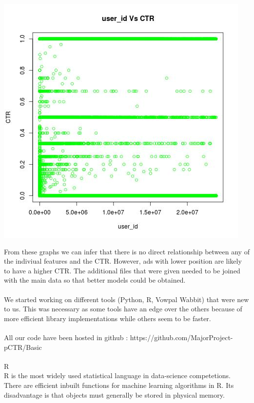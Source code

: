 \documentclass[10pt]{article}
\begin{document}
\includegraphics[scale=0.5]{user_id_Vs_CTR}

From these graphs we can infer that there is no direct relationship between any of the indiviual features and the CTR. However, ads with lower position are likely to have a higher CTR.
The additional files that were given needed to be joined with the main data so that better models could be obtained. \\\\

We started working on different tools (Python, R, Vowpal Wabbit) that were new to us. This was necessary as some tools have an edge over the others because of more efficient library implementations while others seem to be faster. \\\\

All our code have been hosted in github : https://github.com/MajorProject-pCTR/Basic \\\\

R \\
R is the most widely used statistical language in data-science competetions. There are efficient inbuilt functions for machine learning algorithms in R. Its disadvantage is that objects must generally be stored in physical memory. \\\\
\end{document}
